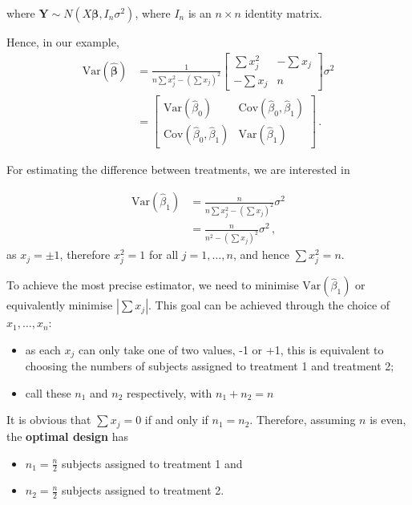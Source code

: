 \documentclass[
]{book}
\providecommand{\tightlist}{%
  \setlength{\itemsep}{0pt}\setlength{\parskip}{0pt}}
\theoremstyle{definition}
\theoremstyle{definition}
\theoremstyle{definition}
\theoremstyle{definition}
\theoremstyle{remark}
\begin{document}
where \(\boldsymbol{Y}\sim N(X\boldsymbol{\beta},I_n\sigma^{2})\), where \(I_n\) is an \(n\times n\) identity matrix.

Hence, in our example,
\begin{align*}
\textrm{Var}(\hat{\boldsymbol{\beta}}) & = \frac{1}{n\sum x_j^{2}-(\sum x_j)^{2}}\left[\begin{array}{cc}
\sum x_j^{2}&-\sum x_j\\
-\sum x_j&n\end{array}\right]\sigma^{2}\\
& = \left[\begin{array}{cc}
\textrm{Var}(\hat\beta_{0})&\textrm{Cov}(\hat\beta_{0},\hat\beta_{1})\\
\textrm{Cov}(\hat\beta_{0},\hat\beta_{1})&\textrm{Var}(\hat\beta_{1})\end{array}\right]\,.
\end{align*}

For estimating the difference between treatments, we are interested in

\begin{align*}
\textrm{Var}(\hat{\beta}_{1})& = \frac{n}{n\sum x_j^{2}-(\sum x_j)^{2}}\sigma^{2}\\
 & = \frac{n}{n^2 - (\sum x_j)^2}\sigma^{2}\,,
\end{align*}
as \(x_j=\pm 1\), therefore \(x_j^2=1\) for all \(j=1,\ldots,n\), and hence \(\sum x_j^2=n\).

To achieve the most precise estimator, we need to minimise \(\textrm{Var}(\hat{\beta}_{1})\) or equivalently minimise \(|\sum x_j|\). This goal can be achieved through the choice of \(x_{1},\dots,x_{n}\):

\begin{itemize}
\tightlist
\item
  as each \(x_j\) can only take one of two values, -1 or +1, this is equivalent to choosing the numbers of subjects assigned to treatment 1 and treatment 2;
\item
  call these \(n_{1}\) and \(n_{2}\) respectively, with \(n_{1}+n_{2}=n\)
\end{itemize}

It is obvious that \(\sum x_j = 0\) if and only if \(n_1=n_2\). Therefore, assuming \(n\) is even, the \textbf{optimal design} has

\begin{itemize}
\tightlist
\item
  \(n_{1}=\frac{n}{2}\) subjects assigned to treatment 1 and
\item
  \(n_{2}=\frac{n}{2}\) subjects assigned to treatment 2.
\end{itemize}
\end{document}
